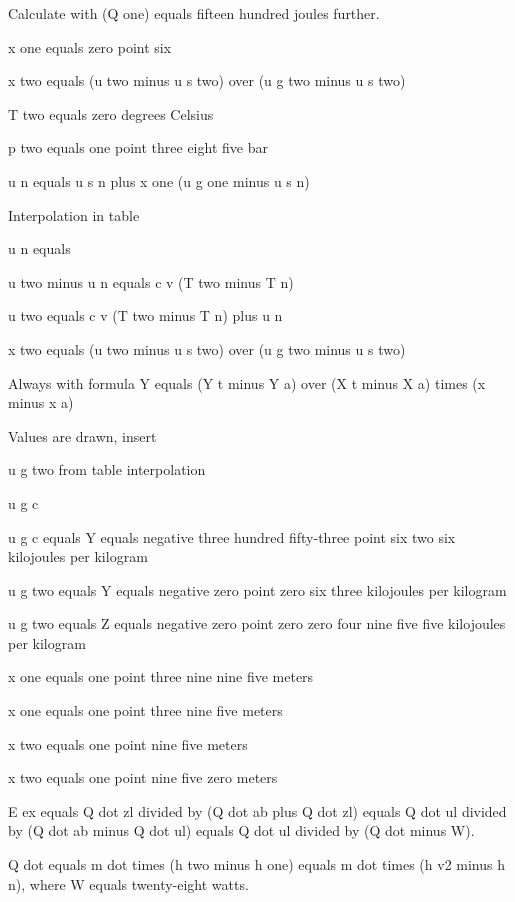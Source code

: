 Calculate with (Q one) equals fifteen hundred joules further.

x one equals zero point six

x two equals (u two minus u s two) over (u g two minus u s two)

T two equals zero degrees Celsius

p two equals one point three eight five bar

u n equals u s n plus x one (u g one minus u s n)

Interpolation in table

u n equals

u two minus u n equals c v (T two minus T n)

u two equals c v (T two minus T n) plus u n

x two equals (u two minus u s two) over (u g two minus u s two)

Always with formula Y equals (Y t minus Y a) over (X t minus X a) times (x minus x a)

Values are drawn, insert

u g two from table interpolation

u g c

u g c equals Y equals negative three hundred fifty-three point six two six kilojoules per kilogram

u g two equals Y equals negative zero point zero six three kilojoules per kilogram

u g two equals Z equals negative zero point zero zero four nine five five kilojoules per kilogram

x one equals one point three nine nine five meters

x one equals one point three nine five meters

x two equals one point nine five meters

x two equals one point nine five zero meters

E ex equals Q dot zl divided by (Q dot ab plus Q dot zl) equals Q dot ul divided by (Q dot ab minus Q dot ul) equals Q dot ul divided by (Q dot minus W).

Q dot equals m dot times (h two minus h one) equals m dot times (h v2 minus h n), where W equals twenty-eight watts.